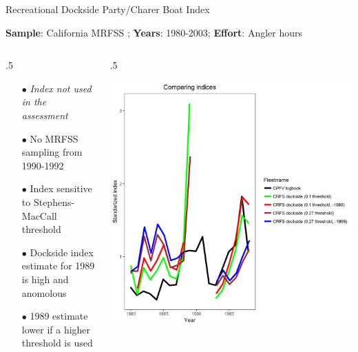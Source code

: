 \documentclass[ignorenonframetext,]{beamer}
\def\begincols{\begin{columns}}
\def\begincol{\begin{column}}
\def\endcol{\end{column}}
\def\endcols{\end{columns}}
\begin{document}
\begin{frame}{Recreational Dockside Party/Charer Boat Index}

\textbf{Sample}: California MRFSS ; \textbf{Years}: 1980-2003;
\textbf{Effort}: Angler hours

\begincols
 \begincol{.5\textwidth}

\begin{itemize}
\item[$\bullet$] \emph{Index not used in the assessment}
\item[$\bullet$] No MRFSS sampling from 1990-1992
\item[$\bullet$] Index sensitive to Stephens-MacCall threshold
\item[$\bullet$] Dockside index estimate for 1989 is high and anomolous
\item[$\bullet$] 1989 estimate lower if a higher threshold is used
\end{itemize}

\endcol
 \begincol{.5\textwidth}

\includegraphics{Figures/Fleet5_RecPC_dockside_index_compare.png}

\endcol
\endcols

\end{frame}
\end{document}
